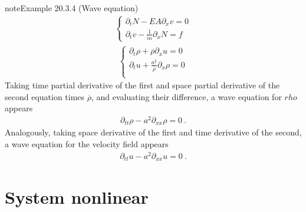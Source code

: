 \documentclass[letterpaper,10pt,english]{jupyterBook}
\begin{document}
\begin{sphinxadmonition}{note}{Example 20.3.4 (Wave equation)}
\begin{equation*}
\begin{split}
\begin{cases}
  \partial_t N - EA \partial_x v = 0 \\
  \partial_t v - \frac{1}{m}\partial_x N = f
\end{cases}\end{split}
\end{equation*}
\sphinxAtStartPar
{}
\begin{equation*}
\begin{split}\begin{cases}
  \partial_t \rho + \overline{\rho} \partial_x u = 0 \\
  \partial_t u    + \frac{a^2}{\overline{\rho}} \partial_x \rho = 0 \\
\end{cases}\end{split}
\end{equation*}
\sphinxAtStartPar
Taking time partial derivative of the first and space partial derivative of the second equation times \(\overline{\rho}\), and evaluating their difference, a wave equation for \(rho\) appears
\begin{equation*}
\begin{split}\partial_{tt} \rho - a^2 \partial_{xx} \rho = 0 \ .\end{split}
\end{equation*}
\sphinxAtStartPar
Analogously, taking space derivative of the first and time derivative of the second, a wave equation for the velocity field appears
\begin{equation*}
\begin{split}\partial_{tt} u - a^2 \partial_{xx} u = 0 \ .\end{split}
\end{equation*}\end{sphinxadmonition}


\section{System non\sphinxhyphen{}linear}
\label{\detokenize{ch/pde/hyperbolic:system-non-linear}}\label{\detokenize{ch/pde/hyperbolic:pde-hyperbolic-system-non-linear}}
\end{document}

